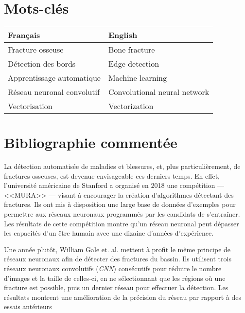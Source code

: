 \documentclass[a4paper]{article}
\begin{document}
\section{Mots-clés}

\begin{table}[h]
    \centering
    \label{tab:keywords}
    \begin{tabular}{l|l}
    Français & English \\\hline
    Fracture osseuse & Bone fracture \\
    Détection des bords & Edge detection \\
    Apprentissage automatique & Machine learning \\
    Réseau neuronal convolutif & Convolutional neural network  \\
    Vectorisation & Vectorization \\
    \end{tabular}
\end{table}

\section{Bibliographie commentée}

\paragraph{}

La détection automatisée de maladies et blessures, et, plus particulièrement, de fractures osseuses, est devenue
envisageable ces derniers temps. En effet, l'université américaine de Stanford a organisé en 2018 une compétition ---
<<MURA>> --- visant à encourager la création d'algorithmes détectant des fractures.  Ils ont mis à disposition une large
base de données d'exemples pour permettre aux réseaux neuronaux programmés par les candidats de s'entraîner.  Les
résultats de cette compétition montre qu'un réseau neuronal peut dépasser les capacités d'un être humain avec une dizaine
d'années d'expérience\cite{mura-competition}.

Une année plutôt, William Gale et. al. mettent à profit le même principe de réseaux neuronaux afin de détecter des
fractures du bassin\cite{detect-hip}.  Ils utilisent trois réseaux neuronaux convolutifs (\emph{CNN}) consécutifs
pour réduire le nombre d'images et la taille de celles-ci, en ne sélectionnant que les régions où une fracture est
possible, puis un dernier réseau pour effectuer la détection. Les résultats montrent une amélioration de la précision du
réseau par rapport à des essais antérieurs
\end{document}
